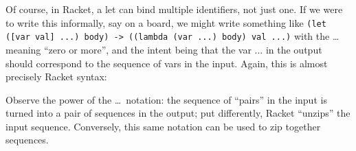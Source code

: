 Of course, in Racket, a let can bind multiple identifiers, not just one. If we
were to write this informally, say on a board, we might write something like
\verb|(let ([var val] ...) body) -> ((lambda (var ...) body) val ...)| with the
\ldots meaning “zero or more”, and the intent being that the var ... in the
output should correspond to the sequence of vars in the input. Again, this is
almost precisely Racket syntax:

Observe the power of the \ldots\ notation: the sequence of “pairs” in the input
is turned into a pair of sequences in the output; put differently, Racket
“unzips” the input sequence. Conversely, this same notation can be used to zip
together sequences.
